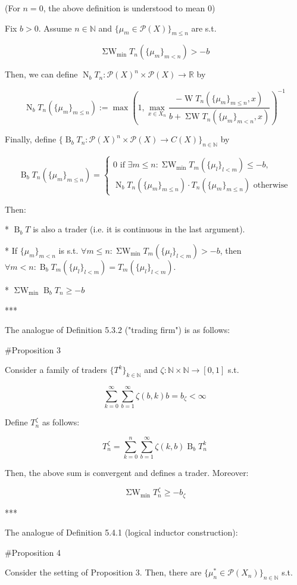 \documentclass[a4paper]{article}
\newcommand{\Nats}{\mathbb{N}}
\newcommand{\Reals}{\mathbb{R}}
\newcommand{\Prob}{\mathcal{P}}
\newcommand{\B}{\operatorname{B}_b}
\newcommand{\N}{\operatorname{N}_b}
\newcommand{\W}{\operatorname{W}}
\newcommand{\SW}{\operatorname{\Sigma W}}
\newcommand{\SWm}{\operatorname{\Sigma W}_{\min}}
\begin{document}
(For ${n=0}$, the above definition is understood to mean 0)

Fix ${b > 0}$. Assume ${n \in \Nats}$ and $\{\mu_m \in \Prob(X)\}_{m \leq n}$ are s.t. 

$$\SWm T_n(\{\mu_m\}_{m < n}) > -b$$

Then, we can define ${\N T_n: \Prob(X)^n \times \Prob(X) \rightarrow \Reals}$ by

$$\N T_n(\{\mu_m\}_{m \leq n}) :=\max(1,\max_{x \in X_n} \frac{-\W T_n(\{\mu_m\}_{m \leq n}, x)}{b + \SW T_n(\{\mu_m\}_{m < n},x)})^{-1}$$

Finally, define ${\{\B T_n: \Prob(X)^n \times \Prob(X) \rightarrow C(X)\}_{n \in \Nats}}$ by

$$\B T_n(\{\mu_m\}_{m \leq n})=\begin{cases}0 \text{ if } \exists m \leq n: \SWm T_m(\{\mu_l\}_{l < m}) \leq -b, \\ \N T_n(\{\mu_m\}_{m \leq n}) \cdot T_n(\{\mu_m\}_{m \leq n}) \text{ otherwise} \end{cases}$$

Then:

* ${\B T}$ is also a trader (i.e. it is continuous in the last argument).

* If ${\{\mu_m\}_{m<n}}$ is s.t. $\forall m \leq n: \SWm T_m(\{\mu_l\}_{l<m}) > -b$, then ${\forall m < n: \B T_m(\{\mu_l\}_{l<m}) = T_m(\{\mu_l\}_{l<m})}$.

* $\SWm\B T_n \geq -b$

***

The analogue of Definition 5.3.2 ("trading firm") is as follows:

\#Proposition 3

Consider a family of traders $\{T^k\}_{k \in \Nats}$ and ${\zeta: \Nats \times \Nats \rightarrow [0,1]}$ s.t.

$$\sum_{k=0}^\infty \sum_{b=1}^\infty \zeta(b,k) b = b_\zeta < \infty$$

Define ${T^\zeta_n}$ as follows:

$$T^\zeta_n = \sum_{k=0}^n \sum_{b=1}^\infty \zeta(k,b) \B T^k_n$$

Then, the above sum is convergent and defines a trader. Moreover:

$$\SWm T^\zeta_n \geq -b_\zeta$$

***

The analogue of Definition 5.4.1 (logical inductor construction):

\#Proposition 4

Consider the setting of Proposition 3. Then, there are ${\{\mu^*_n \in \Prob(X_n)\}_{n \in \Nats}}$ s.t.
\end{document}
